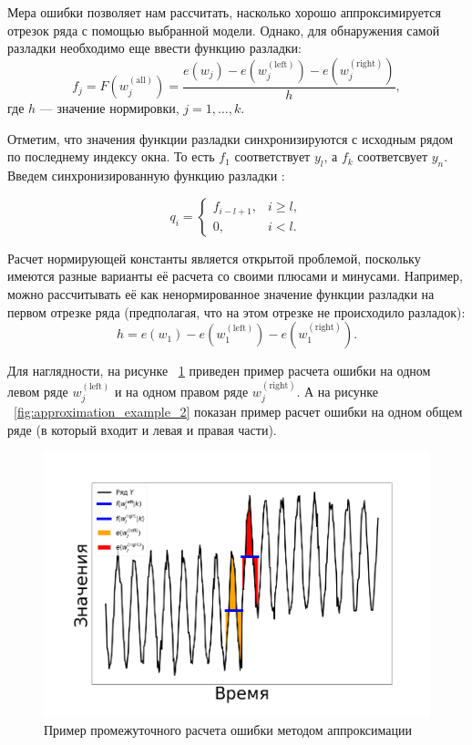 \documentclass[%
12pt,
master,  %
natbib,      %
subf,        %
substylefile = spbu.rtx,
href,        %
colorlinks,  %
]{disser}
\begin{document}
Мера ошибки позволяет нам рассчитать, насколько хорошо аппроксимируется отрезок ряда с помощью выбранной модели. Однако, для обнаружения самой разладки необходимо еще ввести функцию разладки:
\begin{equation*}
f_j = F(w_j^{\mathrm{(all)}} ) = \frac{e(w_j) - e(w_j^{\mathrm{(left)}}) - e(w_j^{\mathrm{(right)}})}{h}, 
\end{equation*}
где $h$ --- значение нормировки, $j = 1, \dots, k$.

Отметим, что значения функции разладки синхронизируются с исходным рядом по последнему индексу окна. То есть $f_1$ соответствует $y_l$, а $f_k $ соответсвует $y_n$. Введем синхронизированную функцию разладки :

\begin{equation*}
q_i =
	\begin{cases}
		f_{i-l+1}, & i \geq l, \\
		0, & i < l.
	\end{cases}
\end{equation*}

Расчет нормирующей константы является открытой проблемой, поскольку имеются разные варианты её расчета со своими плюсами и минусами.
Например, можно рассчитывать её как ненормированное значение функции разладки на первом отрезке ряда (предполагая, что на этом отрезке не происходило разладок):
\begin{equation*} 
h = e(w_1) - e(w_1^{\mathrm{(left)}}) - e(w_1^{\mathrm{(right)}}). 
\end{equation*}

Для наглядности, на рисунке ~\ref{fig:approximation_example_1} приведен пример расчета ошибки на одном левом ряде $ w_j^{\mathrm{(left)}} $ и на одном правом ряде $ w_j^{\mathrm{(right)}} $. А на рисунке ~\ref{fig:approximation_example_2} показан пример расчет ошибки на одном общем ряде (в который входит и левая и правая части).


\begin{figure}[!hhh]
	\begin{center}
		\includegraphics[width=12cm]{approaches_second_2_ru}
	\end{center}
	\vspace{-5mm}\caption{Пример промежуточного расчета ошибки методом аппроксимации}
	\label{fig:approximation_example_1}
\end{figure}
\end{document}
